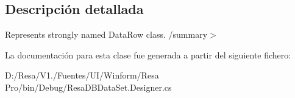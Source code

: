 

\subsection{Descripción detallada}
Represents strongly named Data\+Row class. /summary$>$ 

La documentación para esta clase fue generada a partir del siguiente fichero\+:\begin{DoxyCompactItemize}
\item 
D\+:/\+Resa/\+V1./\+Fuentes/\+U\+I/\+Winform/\+Resa Pro/bin/\+Debug/Resa\+D\+B\+Data\+Set.\+Designer.\+cs\end{DoxyCompactItemize}
